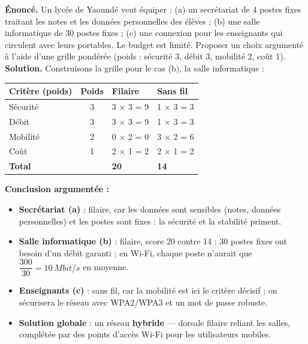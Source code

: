 \documentclass[11pt]{article}
\begin{document}
\begin{exoresolu}
\textbf{Énoncé.} Un lycée de Yaoundé veut équiper : (a) un secrétariat de 4 postes fixes traitant les notes et les données personnelles des élèves ; (b) une salle informatique de 30 postes fixes ; (c) une connexion pour les enseignants qui circulent avec leurs portables. Le budget est limité. Proposer un choix argumenté à l'aide d'une grille pondérée (poids : sécurité 3, débit 3, mobilité 2, coût 1).
\tcblower
\textbf{Solution.} Construisons la grille pour le cas (b), la salle informatique :

\begin{center}
\begin{tabularx}{\linewidth}{|l|c|X|X|}
\hline
\rowcolor{popblueL} \textbf{Critère (poids)} & \textbf{Poids} & \textbf{Filaire} & \textbf{Sans fil} \\
\hline
Sécurité & 3 & 3 $\times$ 3 = 9 & 1 $\times$ 3 = 3 \\
\hline
Débit & 3 & 3 $\times$ 3 = 9 & 1 $\times$ 3 = 3 \\
\hline
Mobilité & 2 & 0 $\times$ 2 = 0 & 3 $\times$ 2 = 6 \\
\hline
Coût & 1 & 2 $\times$ 1 = 2 & 2 $\times$ 1 = 2 \\
\hline
\rowcolor{popgreenL} \textbf{Total} & & \textbf{20} & \textbf{14} \\
\hline
\end{tabularx}
\end{center}

\textbf{Conclusion argumentée :}
\begin{itemize}
\item \textbf{Secrétariat (a)} : filaire, car les données sont sensibles (notes, données personnelles) et les postes sont fixes : la sécurité et la stabilité priment.
\item \textbf{Salle informatique (b)} : filaire, score 20 contre 14 : 30 postes fixes ont besoin d'un débit garanti ; en Wi-Fi, chaque poste n'aurait que $\dfrac{300}{30} = \SI{10}{Mbit/s}$ en moyenne.
\item \textbf{Enseignants (c)} : sans fil, car la mobilité est ici le critère décisif ; on sécurisera le réseau avec WPA2/WPA3 et un mot de passe robuste.
\item \textbf{Solution globale} : un réseau \textbf{hybride} — dorsale filaire reliant les salles, complétée par des points d'accès Wi-Fi pour les utilisateurs mobiles.
\end{itemize}
\end{exoresolu}
\end{document}
